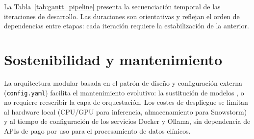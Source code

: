 La Tabla~\ref{tab:gantt_pipeline} presenta la secuenciación temporal de las iteraciones de
desarrollo. Las duraciones son orientativas y reflejan el orden de dependencias entre etapas:
cada iteración requiere la estabilización de la anterior.



\section{Sostenibilidad y mantenimiento}\label{section:gestion_sostenibilidad}


La arquitectura modular basada en el patrón de diseño  y configuración externa (\texttt{config.yaml}) facilita
el mantenimiento evolutivo: la sustitución de modelos ,  o
 no requiere reescribir la capa de orquestación. Los costes de despliegue se
limitan al hardware local (CPU/GPU para inferencia, almacenamiento para Snowstorm) y al tiempo de
configuración de los servicios Docker y Ollama, sin dependencia de APIs de pago por uso para el
procesamiento de datos clínicos.
